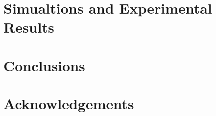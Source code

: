 \documentclass[journal,letterpaper]{IEEEtran}
\begin{document}
\section{Simualtions and Experimental Results}



\section{Conclusions}
\label{sec:conclusion}

\small
\section*{Acknowledgements}	



\printbibliography
\end{document}
